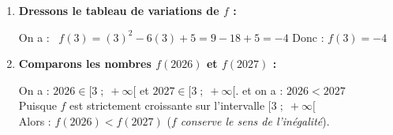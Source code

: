 \documentclass[10pt, a4paper]{article}
\begin{document}
\begin{Solution}[APPLICATION][9]
\begin{enumerate}[leftmargin=*,itemsep=0.5pt]
    \item \textbf{Dressons le tableau de variations de $f$ :}
    
    On a :~ $f(3) = (3)^2 - 6(3) + 5 = 9 - 18 + 5  = -4$ \quad
    Donc : \quad $f(3) = -4$

\begin{center}
\end{center}

    \item \textbf{Comparons les nombres $f(2026)$ et $f(2027)$ :}
    
    On a : $2026 \in \big[3 \;;\; +\infty\big[$ et $2027 \in \big[3 \;;\; +\infty\big[$. 
    et on a :  $2026 < 2027$ \\
    Puisque $f$ est strictement croissante sur l'intervalle $\big[3 \;;\; +\infty\big[$ \\
    Alors : \quad $f(2026) < f(2027)$ \quad (\textit{$f$ conserve le sens de l'inégalité}).

\end{enumerate}
\end{Solution}
\end{document}
